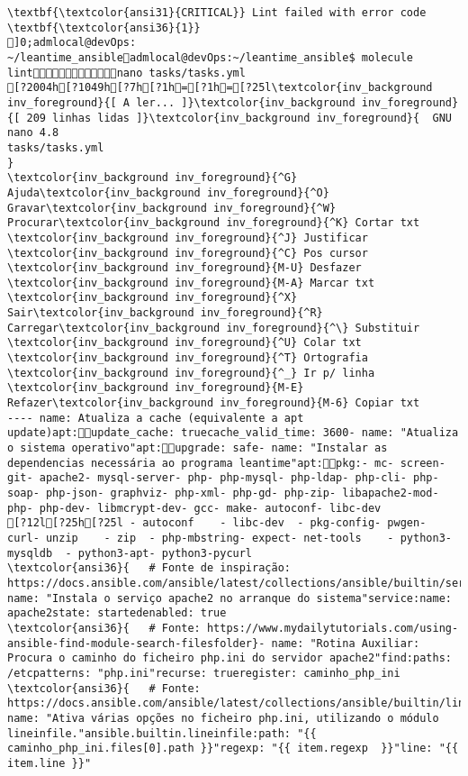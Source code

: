 \documentclass{scrartcl}
\begin{document}
\begin{Verbatim}
\textbf{\textcolor{ansi31}{CRITICAL}} Lint failed with error code \textbf{\textcolor{ansi36}{1}}
]0;admlocal@devOps: ~/leantime_ansibleadmlocal@devOps:~/leantime_ansible$ molecule lintnano tasks/tasks.yml 
[?2004h[?1049h[?7h[?1h=[?1h=[?25l\textcolor{inv_background inv_foreground}{[ A ler... ]}\textcolor{inv_background inv_foreground}{[ 209 linhas lidas ]}\textcolor{inv_background inv_foreground}{  GNU nano 4.8                                                tasks/tasks.yml                                                             }
\textcolor{inv_background inv_foreground}{^G} Ajuda\textcolor{inv_background inv_foreground}{^O} Gravar\textcolor{inv_background inv_foreground}{^W} Procurar\textcolor{inv_background inv_foreground}{^K} Cortar txt    \textcolor{inv_background inv_foreground}{^J} Justificar    \textcolor{inv_background inv_foreground}{^C} Pos cursor    \textcolor{inv_background inv_foreground}{M-U} Desfazer     \textcolor{inv_background inv_foreground}{M-A} Marcar txt
\textcolor{inv_background inv_foreground}{^X} Sair\textcolor{inv_background inv_foreground}{^R} Carregar\textcolor{inv_background inv_foreground}{^\} Substituir    \textcolor{inv_background inv_foreground}{^U} Colar txt     \textcolor{inv_background inv_foreground}{^T} Ortografia    \textcolor{inv_background inv_foreground}{^_} Ir p/ linha   \textcolor{inv_background inv_foreground}{M-E} Refazer\textcolor{inv_background inv_foreground}{M-6} Copiar txt
---- name: Atualiza a cache (equivalente a apt update)apt:update_cache: truecache_valid_time: 3600- name: "Atualiza o sistema operativo"apt:upgrade: safe- name: "Instalar as dependencias necessária ao programa leantime"apt:pkg:- mc- screen- git- apache2- mysql-server- php- php-mysql- php-ldap- php-cli- php-soap- php-json- graphviz- php-xml- php-gd- php-zip- libapache2-mod-php- php-dev- libmcrypt-dev- gcc- make- autoconf- libc-dev
[?12l[?25h[?25l - autoconf    - libc-dev  - pkg-config- pwgen- curl- unzip    - zip  - php-mbstring- expect- net-tools    - python3-mysqldb  - python3-apt- python3-pycurl
\textcolor{ansi36}{   # Fonte de inspiração: https://docs.ansible.com/ansible/latest/collections/ansible/builtin/service_module.html}- name: "Instala o serviço apache2 no arranque do sistema"service:name: apache2state: startedenabled: true
\textcolor{ansi36}{   # Fonte: https://www.mydailytutorials.com/using-ansible-find-module-search-filesfolder}- name: "Rotina Auxiliar: Procura o caminho do ficheiro php.ini do servidor apache2"find:paths: /etcpatterns: "php.ini"recurse: trueregister: caminho_php_ini
\textcolor{ansi36}{   # Fonte: https://docs.ansible.com/ansible/latest/collections/ansible/builtin/lineinfile_module.html}- name: "Ativa várias opções no ficheiro php.ini, utilizando o módulo lineinfile."ansible.builtin.lineinfile:path: "{{ caminho_php_ini.files[0].path }}"regexp: "{{ item.regexp  }}"line: "{{ item.line }}"

\end{Verbatim}
\end{document}
